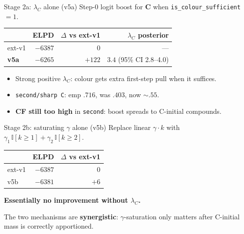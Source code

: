 \documentclass[10pt,aspectratio=169]{beamer}
\newcommand{\main}[1]{\textcolor{CSP-main-dark}{\textbf{#1}}}
\newcommand{\emp}[1]{\textcolor{CSP-emphasis}{\textbf{#1}}}
\newcommand{\accg}[1]{\textcolor{CSP-accent-3-dark}{#1}}      %
\begin{document}
\begin{frame}{Stage 2a: $\lambda_C$ alone (v5a)}
Step-0 logit boost for \emp{C} when \texttt{is\_colour\_sufficient} $= 1$.

\vspace{0.5em}
\begin{center}
\begin{tabular}{lrrr}
\toprule
& ELPD & $\Delta$ vs ext-v1 & $\lambda_C$ posterior\\
\midrule
ext-v1 & $-6387$ & 0 & --- \\
\main{v5a}    & \main{$-6265$} & \main{$+122$}  & \main{$3.4$} (95\% CI 2.8--4.0) \\
\bottomrule
\end{tabular}
\end{center}

\vspace{0.5em}
\begin{itemize}\itemsep0.2em
  \item Strong positive $\lambda_C$: colour gets extra first-step pull when it suffices.
  \item \accg{\texttt{second/sharp C}}: emp $.716$, was $.403$, now $\sim .55$.
  \item \emp{CF still too high} in \texttt{second}: boost spreads to C-initial compounds.
\end{itemize}
\end{frame}

\begin{frame}{Stage 2b: saturating $\gamma$ alone (v5b)}
Replace linear $\gamma \cdot k$ with $\gamma_1 \,\mathbb{I}[k \geq 1] + \gamma_2\,\mathbb{I}[k \geq 2]$.

\vspace{0.5em}
\begin{center}
\begin{tabular}{lrr}
\toprule
& ELPD & $\Delta$ vs ext-v1\\
\midrule
ext-v1 & $-6387$ & 0 \\
v5b    & $-6381$ & \emp{$+6$} \\
\bottomrule
\end{tabular}
\end{center}

\vspace{0.5em}
\emp{Essentially no improvement without $\lambda_C$.}

\vspace{0.5em}
The two mechanisms are \main{synergistic}: $\gamma$-saturation only matters after C-initial mass is correctly apportioned.
\end{frame}
\end{document}
